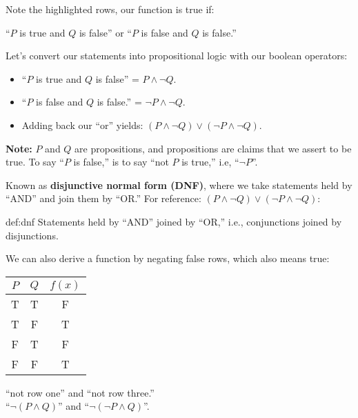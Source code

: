 \noindent
Note the highlighted rows, our function is true if:
\begin{center}
    \large
    ``$P$ is true and $Q$ is false'' or ``$P$ is false and $Q$ is false.''\\
\end{center}

\noindent
Let's convert our statements into propositional logic with our boolean operators:
\begin{itemize}
    \item ``$P$ is true and $Q$ is false'' = $P \land \neg Q$.
    \item ``$P$ is false and $Q$ is false.'' = $\neg P \land \neg Q$.
    \item Adding back our ``or'' yields: $(P \land \neg Q) \lor (\neg P \land \neg Q)$.
\end{itemize}

\begin {Note}
\textbf{Note:} $P$ and $Q$ are propositions, and propositions are claims that we assert to be true.
To say ``$P$ is false,'' is to say ``not $P$ is true,'' i.e, ``$\neg P$''.
\end{Note}

\newpage

\noindent
Known as \textbf{disjunctive normal form (DNF)}, where we take statements held by
``AND'' and join them by ``OR.'' For reference: $(P \land \neg Q) \lor (\neg P \land \neg Q)$:

\begin{Def}{def:dnf}
    Statements held by ``AND'' joined by ``OR,'' i.e., conjunctions joined by disjunctions.
\end{Def}

\noindent
We can also derive a function by negating false rows, which also means true:\\
\begin{center}
    \begin{tabular}{|c|c|c|}
        \hline
        \rowcolor{OliveGreen!10}
        $P$ & $Q$ & $f(x)$ \\
        \hline
        \rowcolor{purple!10}
        T   & T   & F      \\
        T   & F   & T      \\
        \rowcolor{purple!10}
        F   & T   & F      \\
        F   & F   & T      \\
        \hline
    \end{tabular}
\end{center}
\begin{center}
    \large
    ``not row one'' and ``not row three.''\\
    ``$\neg(P \land Q)$'' and ``$\neg(\neg P \land Q)$''.
\end{center}

